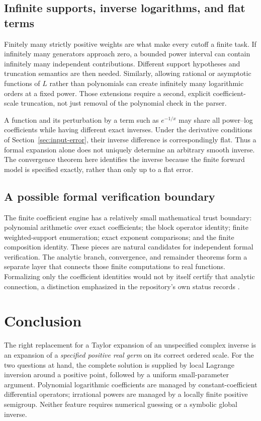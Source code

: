 \documentclass[11pt,a4paper]{article}
\numberwithin{equation}{section}
\theoremstyle{definition}
\begin{document}
\subsection{Infinite supports, inverse logarithms, and flat terms}
Finitely many strictly positive weights are what make every cutoff a
finite task. If infinitely many generators approach zero, a bounded
power interval can contain infinitely many independent contributions.
Different support hypotheses and truncation semantics are then needed.
Similarly, allowing rational or asymptotic functions of $L$ rather than
polynomials can create infinitely many logarithmic orders at a fixed
power. Those extensions require a second, explicit coefficient-scale
truncation, not just removal of the polynomial check in the parser.

A function and its perturbation by a term such as $e^{-1/x}$ may share
all power--log coefficients while having different exact inverses.
Under the derivative conditions of Section~\ref{sec:input-error}, their
inverse difference is correspondingly flat. Thus a formal expansion alone
does not uniquely determine an arbitrary smooth inverse. The convergence
theorem here identifies the inverse because the finite forward model is
specified exactly, rather than only up to a flat error.

\subsection{A possible formal verification boundary}
The finite coefficient engine has a relatively small mathematical trust
boundary: polynomial arithmetic over exact coefficients; the block
operator identity; finite weighted-support enumeration; exact exponent
comparisons; and the finite composition identity. These pieces are
natural candidates for independent formal verification. The analytic
branch, convergence, and remainder theorems form a separate layer that
connects those finite computations to real functions. Formalizing only
the coefficient identities would not by itself certify that analytic
connection, a distinction emphasized in the repository's own status
records \cite{repovol}.

\section{Conclusion}
The right replacement for a Taylor expansion of an unspecified complex
inverse is an expansion of a \emph{specified positive real germ} on its
correct ordered scale. For the two questions at hand, the complete
solution is supplied by local Lagrange inversion around a positive point,
followed by a uniform small-parameter argument. Polynomial logarithmic
coefficients are managed by constant-coefficient differential operators;
irrational powers are managed by a locally finite positive semigroup.
Neither feature requires numerical guessing or a symbolic global inverse.
\end{document}
